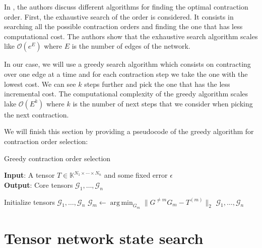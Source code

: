 \documentclass[11pt,a4paper,openright,oneside]{book}
\numberwithin{equation}{section}
\DeclareMathOperator*{\argmin}{arg\,min}
\begin{document}
{In \cite{schindlerAlgorithmsTensorNetwork2020}, the authors discuss different algorithms for finding the optimal contraction order. 
First, the exhaustive search of the order is considered. It consists in searching all the possible contraction orders and finding the
one that has less computational cost. The authors show that the exhaustive search algorithm scales like $\mathcal{O}(e^E)$ where $E$ is the number
of edges of the network.

In our case, we will use a greedy search algorithm which consists on contracting over one edge at a time and for each
contraction step we take the one with the lowest cost. We can see $k$ steps further
and pick the one that has the less incremental cost. The computational complexity of the greedy algorithm scales lake
$\mathcal{O}(E^k)$ where $k$ is the number of next steps that we consider when picking the next contraction.

We will finish this section by providing a pseudocode of the greedy algorithm for contraction order selection:

\begin{algorithm}[H]
    \caption{Greedy contraction order selection}

    \hspace*{\algorithmicindent} \textbf{Input}: A tensor $T \in \mathbb{K}^{N_1 \times \cdots \times N_n}$ and some fixed error $\epsilon$ \\
    \hspace*{\algorithmicindent} \textbf{Output}: Core tensors $\mathcal{G}_1, \dots, \mathcal{G}_n$ 

    \begin{algorithmic}[1]
        \State Initialize tensors $\mathcal{G}_1, \dots, \mathcal{G}_n$
            \State $\mathcal{G}_m \leftarrow \argmin_{G_m} \|G^{\neq m} G_m - T^{(m)}\|_2$
            \EndFor
        \EndWhile
        \State \Return $\mathcal{G}_1, \dots, \mathcal{G}_n$

    \end{algorithmic}

\end{algorithm}
\fi



\chapter{Tensor network state search}


}
\end{document}
